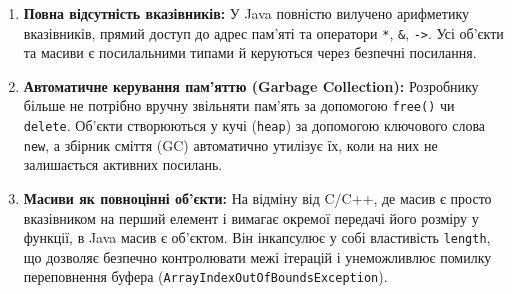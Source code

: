 \begin{enumerate}
    \item \textbf{Повна відсутність вказівників:} 
    У Java повністю вилучено арифметику вказівників, прямий доступ до адрес пам'яті та 
    оператори \texttt{*}, \texttt{\&}, \texttt{->}. Усі об'єкти та масиви є посилальними 
    типами й керуються через безпечні посилання.
    \item \textbf{Автоматичне керування пам'яттю (Garbage Collection):} 
    Розробнику більше не потрібно вручну звільняти пам'ять за допомогою \texttt{free()} 
    чи \texttt{delete}. Об'єкти створюються у кучі (\texttt{heap}) за допомогою ключового 
    слова \texttt{new}, а збірник сміття (GC) автоматично утилізує їх, коли на них не залишається 
    активних посилань.
    \item \textbf{Масиви як повноцінні об'єкти:} 
    На відміну від C/C++, де масив є просто вказівником на перший елемент і вимагає окремої
     передачі його розміру у функції, в Java масив є об'єктом. Він інкапсулює у собі 
     властивість \texttt{length}, що дозволяє безпечно контролювати межі ітерацій і унеможливлює 
     помилку переповнення буфера (\texttt{ArrayIndexOutOfBoundsException}).
\end{enumerate}
